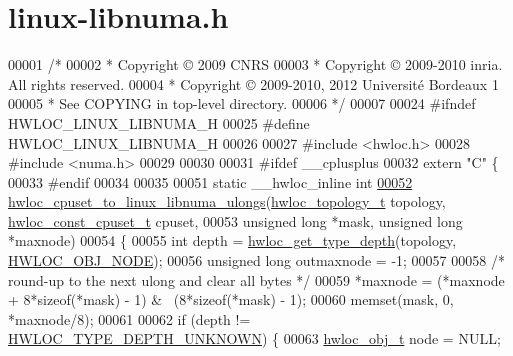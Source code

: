 \hypertarget{a00034_source}{
\section{linux-\/libnuma.h}
}

\begin{DoxyCode}
00001 \textcolor{comment}{/*}
00002 \textcolor{comment}{ * Copyright © 2009 CNRS}
00003 \textcolor{comment}{ * Copyright © 2009-2010 inria.  All rights reserved.}
00004 \textcolor{comment}{ * Copyright © 2009-2010, 2012 Université Bordeaux 1}
00005 \textcolor{comment}{ * See COPYING in top-level directory.}
00006 \textcolor{comment}{ */}
00007 
00024 \textcolor{preprocessor}{#ifndef HWLOC\_LINUX\_LIBNUMA\_H}
00025 \textcolor{preprocessor}{}\textcolor{preprocessor}{#define HWLOC\_LINUX\_LIBNUMA\_H}
00026 \textcolor{preprocessor}{}
00027 \textcolor{preprocessor}{#include <hwloc.h>}
00028 \textcolor{preprocessor}{#include <numa.h>}
00029 
00030 
00031 \textcolor{preprocessor}{#ifdef \_\_cplusplus}
00032 \textcolor{preprocessor}{}\textcolor{keyword}{extern} \textcolor{stringliteral}{"C"} \{
00033 \textcolor{preprocessor}{#endif}
00034 \textcolor{preprocessor}{}
00035 
00051 \textcolor{keyword}{static} \_\_hwloc\_inline \textcolor{keywordtype}{int}
\hypertarget{a00034_source_l00052}{}\hyperlink{a00068_ga018e57a42a780ce2ba2e35ef975d8888}{00052} \hyperlink{a00068_ga018e57a42a780ce2ba2e35ef975d8888}{hwloc_cpuset_to_linux_libnuma_ulongs}(\hyperlink{a00039_ga9d1e76ee15a7dee158b786c30b6a6e38}{hwloc_topology_t} topology, 
      \hyperlink{a00040_ga1f784433e9b606261f62d1134f6a3b25}{hwloc_const_cpuset_t} cpuset,
00053                                     \textcolor{keywordtype}{unsigned} \textcolor{keywordtype}{long} *mask, \textcolor{keywordtype}{unsigned} \textcolor{keywordtype}{long} *maxnode)
00054 \{
00055   \textcolor{keywordtype}{int} depth = \hyperlink{a00046_gaea7c64dd59467f5201ba87712710b14d}{hwloc_get_type_depth}(topology, \hyperlink{a00041_ggacd37bb612667dc437d66bfb175a8dc55aaf0964881117bdedf1a5e9332cd120dd}{HWLOC_OBJ_NODE});
00056   \textcolor{keywordtype}{unsigned} \textcolor{keywordtype}{long} outmaxnode = -1;
00057 
00058   \textcolor{comment}{/* round-up to the next ulong and clear all bytes */}
00059   *maxnode = (*maxnode + 8*\textcolor{keyword}{sizeof}(*mask) - 1) & ~(8*\textcolor{keyword}{sizeof}(*mask) - 1);
00060   memset(mask, 0, *maxnode/8);
00061 
00062   \textcolor{keywordflow}{if} (depth != \hyperlink{a00046_ggaf4e663cf42bbe20756b849c6293ef575a0565ab92ab72cb0cec91e23003294aad}{HWLOC_TYPE_DEPTH_UNKNOWN}) \{
00063     \hyperlink{a00016}{hwloc_obj_t} node = NULL;

\end{DoxyCode}
